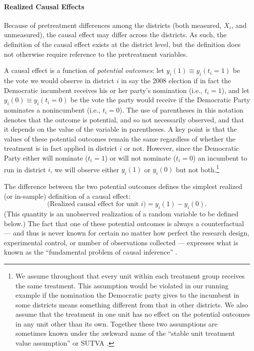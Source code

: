 \documentclass[11pt,titlepage]{article}
\begin{document}
\paragraph{Realized Causal Effects}
Because of pretreatment differences among the districts (both
measured, $X_i$, and unmeasured), the causal effect may differ across
the districts.  As such, the definition of the causal effect exists at
the district level, but the definition does not otherwise require
reference to the pretreatment variables.

A causal effect is a function of \emph{potential outcomes}: let
$y_i(1)\equiv y_i(t_i=1)$ be the vote we would observe in district $i$
in say the 2008 election if in fact the Democratic incumbent receives
his or her party's nomination (i.e., $t_i=1$), and let $y_i(0)\equiv
y_i(t_i=0)$ be the vote the party would receive if the Democratic
Party nominates a nonincumbent (i.e., $t_i=0$).  The use of
parentheses in this notation denotes that the outcome is potential,
and so not necessarily observed, and that it depends on the value of
the variable in parentheses.  A key point is that the values of these
potential outcomes remain the same regardless of whether the treatment
is in fact applied in district $i$ or not.  However, since the
Democratic Party either will nominate ($t_i=1$) or will not nominate
($t_i=0$) an incumbent to run in district $i$, we will observe either
$y_{i}(1)$ or $y_{i}(0)$ but not both.\footnote{We assume throughout
  that every unit within each treatment group receives the same
  treatment.  This assumption would be violated in our running example
  if the nomination the Democratic party gives to the incumbent in
  some districts means something different from that in other
  districts.  We also assume that the treatment in one unit has no
  effect on the potential outcomes in any unit other than its own.
  Together these two assumptions are sometimes known under the awkward
  name of the ``stable unit treatment value assumption'' or SUTVA
  \citep{Rubin74}.}

The difference between the two potential outcomes defines the simplest
realized (or in-sample) definition of a causal effect:
\begin{equation}
  \label{rce}
  \text{(Realized causal effect for unit $i$)} = y_i(1) - y_i(0).
\end{equation}
(This quantity is an unobserved realization of a random variable to be
defined below.)  The fact that one of these potential outcomes is
always a counterfactual --- and thus is never known for certain no
matter how perfect the research design, experimental control, or
number of observations collected --- expresses what is known as the
``fundamental problem of causal inference'' \citep{Holland86}.
\end{document}
